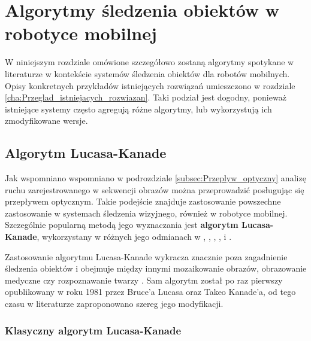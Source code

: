 \chapter{Algorytmy śledzenia obiektów w robotyce mobilnej}
\label{cha:Algorymty_sledzenia_obiektow_w_robotyce_mobilnej}

W niniejszym rozdziale omówione szczegółowo zostaną algorytmy spotykane w literaturze w kontekście systemów śledzenia obiektów dla robotów mobilnych. Opisy konkretnych przykładów istniejących rozwiązań umieszczono w rozdziale \ref{cha:Przeglad_istniejacych_rozwiazan}. Taki podział jest dogodny, ponieważ  istniejące systemy często agregują różne algorytmy, lub wykorzystują ich zmodyfikowane wersje.

\section{Algorytm Lucasa-Kanade}
\label{sec:Algorytm_Lucasa_Kanade}
Jak wspomniano wspomniano w podrozdziale \ref{subsec:Przeplyw_optyczny} analizę ruchu zarejestrowanego w sekwencji obrazów można przeprowadzić posługując się przepływem optycznym. Takie podejście znajduje zastosowanie powszechne zastosowanie w systemach śledzenia wizyjnego, również w robotyce mobilnej. Szczególnie popularną metodą jego wyznaczania jest \textbf{algorytm Lucasa-Kanade}, wykorzystany w różnych jego odmianach w \cite{Campoy2009}, \cite{Fernandez-Caballero2010}, \cite{Liem2008}, \cite{Markovic2014}, \cite{Olivares-Mendez2009} i \cite{Sadeghi-Tehran2014}.

Zastosowanie algorytmu Lucasa-Kanade wykracza znacznie poza zagadnienie śledzenia obiektów i obejmuje między innymi mozaikowanie obrazów, obrazowanie medyczne czy rozpoznawanie twarzy \cite{Baker2004}. Sam algorytm został po raz pierwszy opublikowany w roku 1981 przez Bruce'a Lucasa oraz Takeo Kanade'a, od tego czasu w literaturze zaproponowano szereg jego modyfikacji.

\subsection{Klasyczny algorytm Lucasa-Kanade}
\label{subsec:Klasyczny_algorytm_Lucasa_Kanade}

